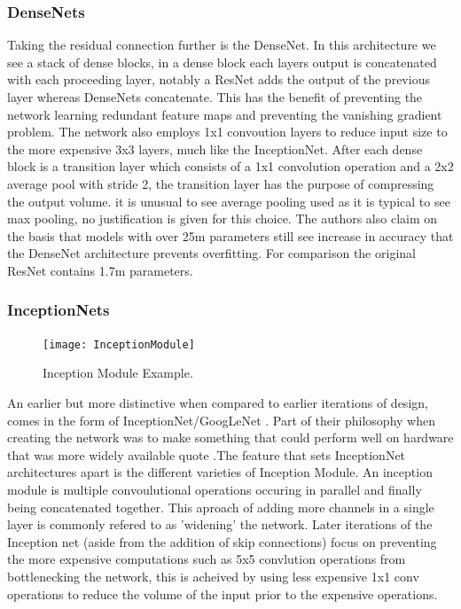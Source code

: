   \subsubsection{DenseNets}
    Taking the residual connection further is the DenseNet. In this architecture we see a stack of dense blocks, in a dense block each layers output is concatenated with each proceeding layer, notably a ResNet adds the output of the previous layer whereas DenseNets concatenate. This has the benefit of preventing the network learning redundant feature maps and preventing the vanishing gradient problem. The network also employs 1x1 convoution layers to reduce input size to the more expensive 3x3 layers, much like the InceptionNet. After each dense block is a transition layer which consists of a 1x1 convolution operation and a 2x2 average pool with stride 2, the transition layer has the purpose of compressing the output volume. it is unusual to see average pooling used as it is typical to see max pooling, no justification is given for this choice. The authors also claim on the basis that models with over 25m parameters still see increase in accuracy that the DenseNet architecture prevents overfitting. For comparison the original ResNet contains 1.7m parameters.

    \newpage

  \subsubsection{InceptionNets}
    \begin{figure}
      \centering
      \texttt{[image: InceptionModule]}
      \caption{\label{fig:InceptionModule}Inception Module Example.}
    \end{figure}
    An earlier but more distinctive when compared to earlier iterations of design, comes in the form of InceptionNet/GoogLeNet \citep{Szegedy2015}. Part of their philosophy when creating the network was to make something that could perform well on hardware that was more widely available quote \citep{Szegedy2015}.The feature that sets InceptionNet architectures apart is the different varieties of Inception Module. An inception module is multiple convoulutional operations occuring in parallel and finally being concatenated together. This aproach of adding more channels in a single layer is commonly refered to as 'widening' the network. Later iterations of the Inception net (aside from the addition of skip connections) focus on preventing the more expensive computations such as 5x5 convlution operations from bottlenecking the network, this is acheived by using less expensive 1x1 conv operations to reduce the volume of the input prior to the expensive operations.
